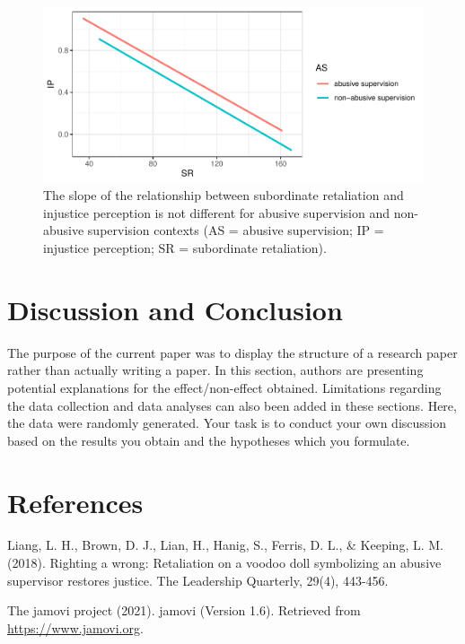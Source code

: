 \documentclass[
]{article}
\begin{document}
\begin{figure}
\centering
\includegraphics{voodoo_report_final_files/figure-latex/unnamed-chunk-2-1.pdf}
\caption{The slope of the relationship between subordinate retaliation
and injustice perception is not different for abusive supervision and
non-abusive supervision contexts (AS = abusive supervision; IP =
injustice perception; SR = subordinate retaliation).}
\end{figure}

\hypertarget{discussion-and-conclusion}{%
\section{Discussion and Conclusion}\label{discussion-and-conclusion}}

The purpose of the current paper was to display the structure of a
research paper rather than actually writing a paper. In this section,
authors are presenting potential explanations for the effect/non-effect
obtained. Limitations regarding the data collection and data analyses
can also been added in these sections. Here, the data were randomly
generated. Your task is to conduct your own discussion based on the
results you obtain and the hypotheses which you formulate.

\hypertarget{references}{%
\section{References}\label{references}}

Liang, L. H., Brown, D. J., Lian, H., Hanig, S., Ferris, D. L., \&
Keeping, L. M. (2018). Righting a wrong: Retaliation on a voodoo doll
symbolizing an abusive supervisor restores justice. The Leadership
Quarterly, 29(4), 443-456.

The jamovi project (2021). jamovi (Version 1.6). Retrieved from
\url{https://www.jamovi.org}.
\end{document}
